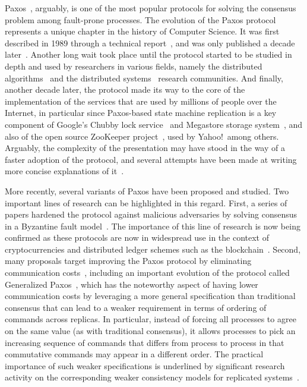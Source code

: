Paxos~\cite{Lamport:1998}, arguably, is one of the most popular protocols for solving the consensus problem among fault-prone processes. The evolution of the Paxos protocol represents a unique chapter in the history of Computer Science. It was first described in 1989 through a technical report~\cite{paxos:tr}, and was only published a decade later~\cite{Lamport:1998}. Another long wait took place until the protocol started to be studied in depth and used by researchers in various fields, namely the distributed algorithms~\cite{Prisco:1997} and the distributed systems~\cite{petal} research communities. And finally, another decade later, the protocol made its way to the core of the implementation of the services that are used by millions of people over the Internet, in particular since Paxos-based state machine replication is a key component of Google's Chubby lock service~\cite{Burrows2006} and Megastore storage system~\cite{36971}, and also of the open source ZooKeeper project~\cite{Hunt2010}, used by Yahoo!\ among others. Arguably, the complexity of the presentation may have stood in the way of a faster
adoption of the protocol, and several attempts have been made at writing more concise explanations of it~\cite{Lamport2001,Renesse2011}.\par

More recently, several variants of Paxos have been proposed and studied. Two important lines of research can be highlighted in this regard. First, a series of papers hardened the protocol against malicious adversaries by solving consensus in a Byzantine fault
model~\cite{Martin2006,Lamport2011}. The importance of this line of research is now being confirmed as these protocols are now in widespread use in the context of cryptocurrencies and distributed ledger schemes such as the blockchain~\cite{bitcoin}. Second, many proposals target improving the Paxos protocol by eliminating communication costs~\cite{Lamport2006}, including an important evolution of the protocol called Generalized
Paxos~\cite{Lamport2005}, which has the noteworthy aspect of having lower communication costs by leveraging a more general specification than traditional consensus 
that can lead to a weaker requirement in terms of ordering of commands across replicas. In particular, instead of forcing all processes to agree on the same value (as with traditional consensus), it allows processes to pick an increasing sequence of commands that differs from process to process in that commutative commands may appear in a different order. The practical importance of such weaker specifications is underlined
by significant research activity on the corresponding weaker consistency models for replicated systems~\cite{Ladin:1990,dynamo}.\par

